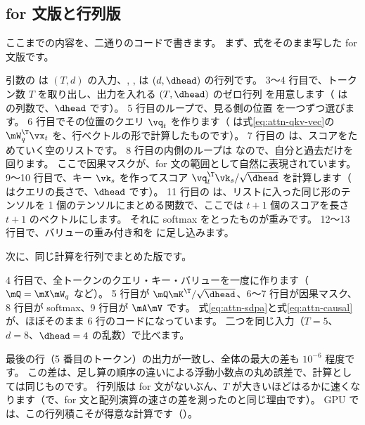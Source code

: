 \subsection*{for 文版と行列版}

ここまでの内容を、二通りのコードで書きます。
まず、式をそのまま写した for 文版です。


引数の  は $(T, d)$ の入力、, ,  は $(d, \dhead)$ の行列です。
3〜4 行目で、トークン数 $T$ を取り出し、出力を入れる $(T,\dhead)$ のゼロ行列  を用意します（ は  の列数で、$\dhead$ です）。
5 行目のループで、見る側の位置  を一つずつ選びます。
6 行目でその位置のクエリ $\vq_t$ を作ります（ は式\eqref{eq:attn-qkv-vec}の $\mW_q^\T\vx_t$ を、行ベクトルの形で計算したものです）。
7 行目の  は、スコアをためていく空のリストです。
8 行目の内側のループは  なので、自分と過去だけを回ります。
ここで因果マスクが、for 文の範囲として自然に表現されています。
9〜10 行目で、キー $\vk_s$ を作ってスコア $\vq_t^\T\vk_s/\sqrt{\dhead}$ を計算します（ はクエリの長さで、$\dhead$ です）。
11 行目の  は、リストに入った同じ形のテンソルを 1 個のテンソルにまとめる関数で、ここでは $t+1$ 個のスコアを長さ $t+1$ のベクトルにします。
それに softmax をとったものが重みです。
12〜13 行目で、バリューの重み付き和を  に足し込みます。

次に、同じ計算を行列でまとめた版です。


4 行目で、全トークンのクエリ・キー・バリューを一度に作ります（$\mQ=\mX\mW_q$ など）。
5 行目が $\mQ\mK^\T/\sqrt{\dhead}$、6〜7 行目が因果マスク、8 行目が softmax、9 行目が $\mA\mV$ です。
式\eqref{eq:attn-sdpa}と式\eqref{eq:attn-causal}が、ほぼそのまま 6 行のコードになっています。
二つを同じ入力（$T=5$、$d=8$、$\dhead=4$ の乱数）で比べます。


最後の行（5 番目のトークン）の出力が一致し、全体の最大の差も $10^{-6}$ 程度です。
この差は、足し算の順序の違いによる浮動小数点の丸め誤差で、計算としては同じものです。
行列版は for 文がないぶん、$T$ が大きいほどはるかに速くなります（で、for 文と配列演算の速さの差を測ったのと同じ理由です）。
GPU では、この行列積こそが得意な計算です（）。

